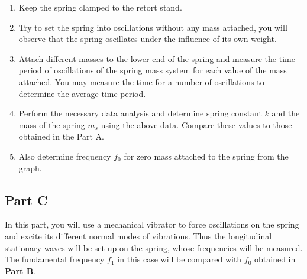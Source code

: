 \begin{enumerate}
\item Keep the spring clamped to the retort stand.

\item Try to set the spring into oscillations without any mass attached, you will observe that the spring oscillates under the influence of its own weight.

\item Attach different masses to the lower end of the spring and measure the time period of oscillations of the spring mass system for each value of the mass attached. You may measure the time for a number of oscillations to determine the average time period.

\item Perform the necessary data analysis and determine spring constant $k$ and the mass of the spring $m_s$ using the above data. Compare these values to those obtained in the Part A.

\item Also determine frequency $f_0$ for zero mass attached to the spring from the graph.

\end{enumerate}


\subsection*{Part C}

In this part, you will use a mechanical vibrator to force oscillations on the spring and excite its different normal modes of vibrations. Thus the longitudinal stationary waves will be set up on the spring, whose frequencies will be measured. The fundamental frequency $f_1$ in this case will be compared with $f_0$ obtained in \textbf{Part B}.

